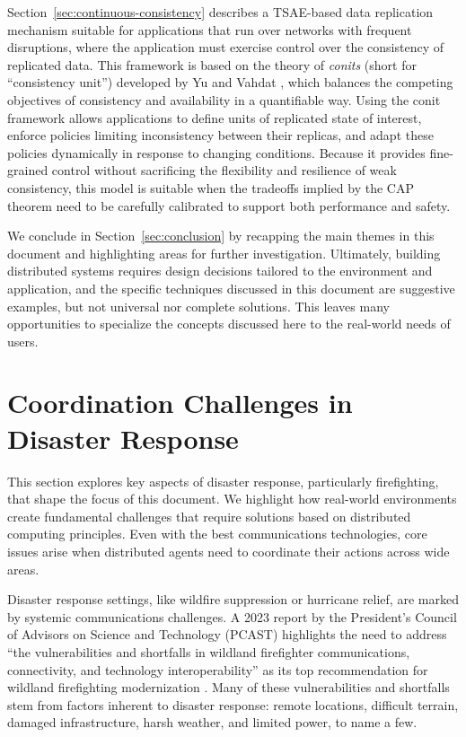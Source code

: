 \documentclass[]             %
{NASA}                       %
\theoremstyle{definition}
\begin{document}
Section~\ref{sec:continuous-consistency} describes a TSAE-based data replication mechanism suitable for applications that run over networks with frequent disruptions, where the application must exercise control over the consistency of replicated data. This framework is based on the theory of \emph{conits} (short for ``consistency unit'') developed by Yu and Vahdat \cite{2002tact}, which balances the competing objectives of consistency and availability in a quantifiable way. %
Using the conit framework allows applications to define units of replicated state of interest, enforce policies limiting inconsistency between their replicas, and adapt these policies dynamically in response to changing conditions. Because it provides fine-grained control without sacrificing the flexibility and resilience of weak consistency, this model is suitable when the tradeoffs implied by the CAP theorem need to be carefully calibrated to support both performance and safety.

We conclude in Section~\ref{sec:conclusion} by recapping the main themes in this document and highlighting areas for further investigation. Ultimately, building distributed systems requires design decisions tailored to the environment and application, and the specific techniques discussed in this document are suggestive examples, but not universal nor complete solutions. This leaves many opportunities to specialize the concepts discussed here to the real-world needs of users.

\section{Coordination Challenges in Disaster Response}\label{sec:disaster-response}
This section explores key aspects of disaster response, particularly
firefighting, that shape the focus of this document. We highlight how
real-world environments create fundamental challenges that require
solutions based on distributed computing principles. Even with the
best communications technologies, core issues arise when distributed
agents need to coordinate their actions across wide areas.

Disaster response settings, like wildfire suppression or hurricane
relief, are marked by systemic communications challenges. A 2023
report by the President’s Council of Advisors on Science and
Technology (PCAST) highlights the need to address ``the
vulnerabilities and shortfalls in wildland firefighter communications,
connectivity, and technology interoperability'' as its top
recommendation for wildland firefighting modernization
\cite{pcast2023}. Many of these vulnerabilities and shortfalls stem
from factors inherent to disaster response: remote locations,
difficult terrain, damaged infrastructure, harsh weather, and limited
power, to name a few.
\end{document}
